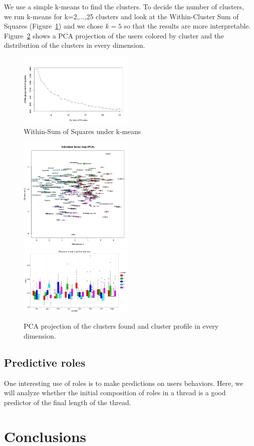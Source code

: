 \documentclass[smallextended]{svjour3}          %
\begin{document}
We use a simple k-means to find the clusters. To decide the number of clusters, we run k-means for k=2,...,25 clusters and look at the Within-Cluster Sum of Squares (Figure~\ref{fig:elbow}) and we chose $k=5$ so that the results are more interpretable.  Figure~\ref{fig:PCA} shows a PCA projection of the users colored by cluster and the distribution of the clusters in every dimension.
\begin{figure}
	\centering
	\includegraphics[width=0.5\textwidth]{elbow}
	\caption{Within-Sum of Squares under k-means}
	\label{fig:elbow}
\end{figure}

\begin{figure}
	\centering
	\includegraphics[width=0.5\textwidth]{PCA_nocolor}
	\includegraphics[width=0.5\textwidth]{whiskers}
	\caption{PCA projection of the clusters found and cluster profile in every dimension.}
	\label{fig:PCA}
\end{figure}

\subsection{Predictive roles}
One interesting use of roles is to make predictions on users behaviors. Here, we will analyze whether the initial composition of roles in a thread is a good predictor of the final length of the thread.

\section{Conclusions}
 
% 
% 

\end{document}
